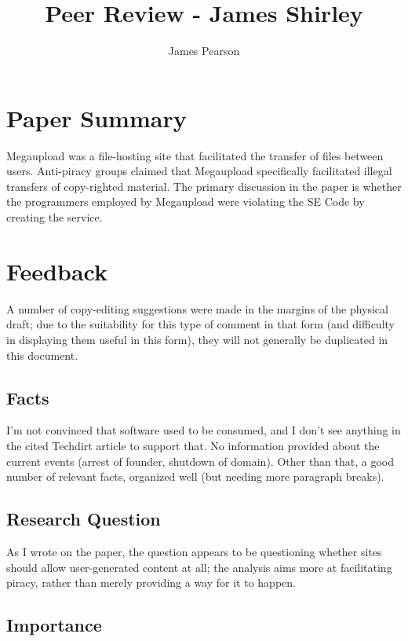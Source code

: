 \documentclass[11pt]{article}
\begin{document}
\author{James Pearson}
\title{Peer Review - James Shirley}
\maketitle

\section{Paper Summary}

Megaupload was a file-hosting site that facilitated the transfer of files between users.  Anti-piracy groups claimed that Megaupload specifically facilitated illegal transfers of copy-righted material.  The primary discussion in the paper is whether the programmers employed by Megaupload were violating the SE Code by creating the service.

\section{Feedback}

A number of copy-editing suggestions were made in the margins of the physical draft; due to the suitability for this type of comment in that form (and difficulty in displaying them useful in this form), they will not generally be duplicated in this document.

\subsection{Facts}

I'm not convinced that software used to be consumed, and I don't see anything in the cited Techdirt article to support that.  No information provided about the current events (arrest of founder, shutdown of domain).  Other than that, a good number of relevant facts, organized well (but needing more paragraph breaks).

\subsection{Research Question}

As I wrote on the paper, the question appears to be questioning whether sites should allow user-generated content at all; the analysis aims more at facilitating piracy, rather than merely providing a way for it to happen.

\subsection{Importance}
\end{document}
